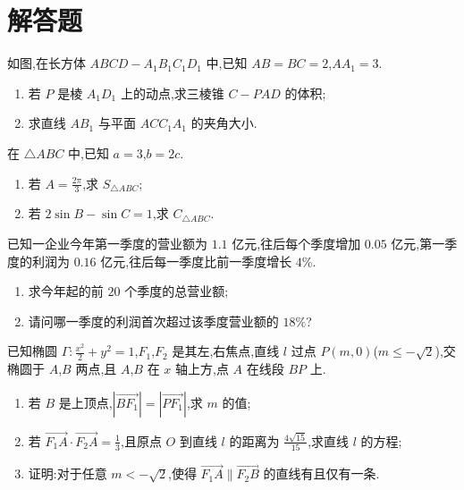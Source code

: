 \section{解答题}

\begin{problem}
如图,在长方体 \(ABCD-A_1B_1C_1D_1\) 中,已知 \(AB=BC=2\),\(AA_1=3\).

\begin{enumerate}
\item 若 \(P\) 是棱 \(A_1D_1\) 上的动点,求三棱锥 \(C-PAD\) 的体积;
\item 求直线 \(AB_1\) 与平面 \(ACC_1A_1\) 的夹角大小.
\end{enumerate}

\end{problem}

\begin{problem}
在 \(\triangle ABC\) 中,已知 \(a=3\),\(b=2c\).

\begin{enumerate}
\item 若 \(A=\frac{2\pi}{3}\),求 \(S_{\triangle ABC}\);
\item 若 \(2\sin B-\sin C=1\),求 \(C_{\triangle ABC}\).
\end{enumerate}
\end{problem}

\begin{problem}
已知一企业今年第一季度的营业额为 \(1.1\) 亿元,往后每个季度增加 \(0.05\) 亿元,第一季度的利润为 \(0.16\) 亿元,往后每一季度比前一季度增长 \(4\%\).

\begin{enumerate}
\item 求今年起的前 \(20\) 个季度的总营业额;
\item 请问哪一季度的利润首次超过该季度营业额的 \(18\%\)?
\end{enumerate}
\end{problem}

\begin{problem}
已知椭圆 \(\Gamma:\frac{x^2}{2}+y^2=1\),\(F_1\),\(F_2\) 是其左,右焦点,直线 \(l\) 过点 \(P(m,0)\)(\(m\le -\sqrt2\)),交椭圆于 \(A\),\(B\) 两点,且 \(A\),\(B\) 在 \(x\) 轴上方,点 \(A\) 在线段 \(BP\) 上.

\begin{enumerate}
\item 若 \(B\) 是上顶点,\(\left| \overrightarrow{BF_1} \right|=\left| \overrightarrow{PF_1} \right|\),求 \(m\) 的值;
\item 若 \(\overrightarrow{F_1A}\cdot \overrightarrow{F_2A}=\frac13\),且原点 \(O\) 到直线 \(l\) 的距离为 \(\frac{4\sqrt{15}}{15}\),求直线 \(l\) 的方程;
\item 证明:对于任意 \(m<-\sqrt2\),使得 \(\overrightarrow{F_1A}\parallel \overrightarrow{F_2B}\) 的直线有且仅有一条.
\end{enumerate}
\end{problem}

